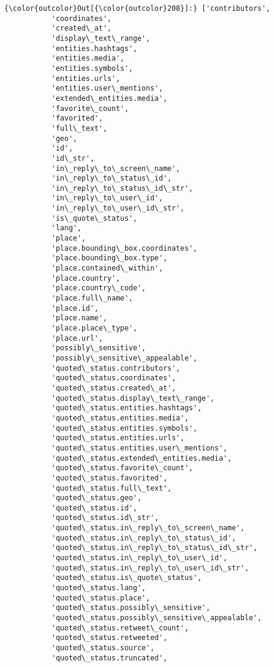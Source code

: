 \documentclass[11pt]{article}
\begin{document}
\begin{Verbatim}[commandchars=\\\{\}]
{\color{outcolor}Out[{\color{outcolor}208}]:} ['contributors',
           'coordinates',
           'created\_at',
           'display\_text\_range',
           'entities.hashtags',
           'entities.media',
           'entities.symbols',
           'entities.urls',
           'entities.user\_mentions',
           'extended\_entities.media',
           'favorite\_count',
           'favorited',
           'full\_text',
           'geo',
           'id',
           'id\_str',
           'in\_reply\_to\_screen\_name',
           'in\_reply\_to\_status\_id',
           'in\_reply\_to\_status\_id\_str',
           'in\_reply\_to\_user\_id',
           'in\_reply\_to\_user\_id\_str',
           'is\_quote\_status',
           'lang',
           'place',
           'place.bounding\_box.coordinates',
           'place.bounding\_box.type',
           'place.contained\_within',
           'place.country',
           'place.country\_code',
           'place.full\_name',
           'place.id',
           'place.name',
           'place.place\_type',
           'place.url',
           'possibly\_sensitive',
           'possibly\_sensitive\_appealable',
           'quoted\_status.contributors',
           'quoted\_status.coordinates',
           'quoted\_status.created\_at',
           'quoted\_status.display\_text\_range',
           'quoted\_status.entities.hashtags',
           'quoted\_status.entities.media',
           'quoted\_status.entities.symbols',
           'quoted\_status.entities.urls',
           'quoted\_status.entities.user\_mentions',
           'quoted\_status.extended\_entities.media',
           'quoted\_status.favorite\_count',
           'quoted\_status.favorited',
           'quoted\_status.full\_text',
           'quoted\_status.geo',
           'quoted\_status.id',
           'quoted\_status.id\_str',
           'quoted\_status.in\_reply\_to\_screen\_name',
           'quoted\_status.in\_reply\_to\_status\_id',
           'quoted\_status.in\_reply\_to\_status\_id\_str',
           'quoted\_status.in\_reply\_to\_user\_id',
           'quoted\_status.in\_reply\_to\_user\_id\_str',
           'quoted\_status.is\_quote\_status',
           'quoted\_status.lang',
           'quoted\_status.place',
           'quoted\_status.possibly\_sensitive',
           'quoted\_status.possibly\_sensitive\_appealable',
           'quoted\_status.retweet\_count',
           'quoted\_status.retweeted',
           'quoted\_status.source',
           'quoted\_status.truncated',

\end{Verbatim}
\end{document}
